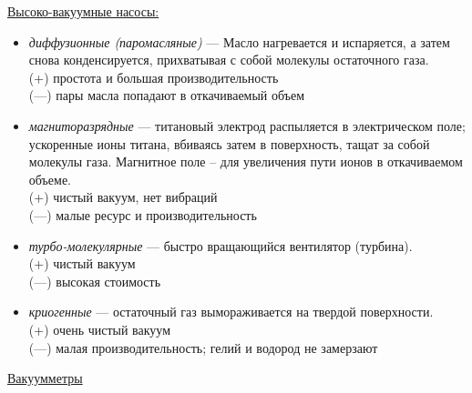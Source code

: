 \documentclass[12pt,epsfig,color,russian]{article}
\begin{document}
\underline{Высоко-вакуумные насосы:}
\begin{itemize}
\item {\sl диффузионные (паромасляные)} --- Масло нагревается и испаряется, а затем снова конденсируется, прихватывая с собой молекулы оста\-то\-ч\-но\-го газа.\\
    {\color{blue}(+) простота и большая производительность}\\
    {\color{red}(---) пары масла попадают в откачиваемый объем}
\item {\sl магниторазрядные} --- титановый электрод распыляется в электри\-че\-с\-ком поле; ускоренные ионы титана, вбиваясь затем в поверхность, тащат за собой молекулы газа. Магнитное поле -- для увеличения пути ионов в откачиваемом объеме.\\
    {\color{blue}(+) чистый вакуум, нет вибраций}\\
    {\color{red}(---) малые ресурс и производительность}
\item {\sl турбо-молекулярные} --- быстро вращающийся вентилятор (турбина).\\
    {\color{blue}(+) чистый вакуум}\\
    {\color{red}(---) высокая стоимость}
\item {\sl криогенные} --- остаточный газ вымораживается на твердой поверхности.\\
    {\color{blue}(+) очень чистый вакуум}\\
    {\color{red}(---) малая производительность; гелий и водород не замерзают}
\end{itemize}
\newpage
\underline{Вакуумметры}
\end{document}
